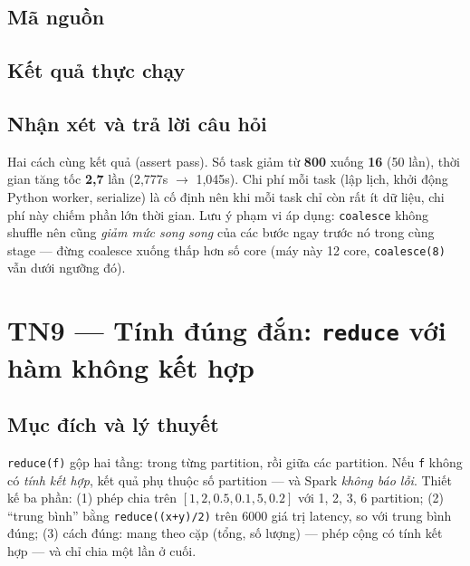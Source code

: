 \documentclass[12pt,a4paper,oneside]{article}
\begin{document}
\subsection{Mã nguồn}



\subsection{Kết quả thực chạy}



\subsection{Nhận xét và trả lời câu hỏi}

Hai cách cùng kết quả (assert pass). Số task giảm từ \textbf{800} xuống \textbf{16} (50 lần), thời gian tăng tốc \textbf{2,7} lần (2,777s $\to$ 1,045s). Chi phí mỗi task (lập lịch, khởi động Python worker, serialize) là cố định nên khi mỗi task chỉ còn rất ít dữ liệu, chi phí này chiếm phần lớn thời gian. Lưu ý phạm vi áp dụng: \texttt{coalesce} không shuffle nên cũng \emph{giảm mức song song} của các bước ngay trước nó trong cùng stage --- đừng coalesce xuống thấp hơn số core (máy này 12 core, \texttt{coalesce(8)} vẫn dưới ngưỡng đó).

\section{TN9 --- Tính đúng đắn: \texttt{reduce} với hàm không kết hợp}
\label{sec:tn9}

\subsection{Mục đích và lý thuyết}

\texttt{reduce(f)} gộp hai tầng: trong từng partition, rồi giữa các partition. Nếu \texttt{f} không có \emph{tính kết hợp}, kết quả phụ thuộc số partition --- và Spark \emph{không báo lỗi}. Thiết kế ba phần: (1) phép chia trên $[1, 2, 0.5, 0.1, 5, 0.2]$ với 1, 2, 3, 6 partition; (2) ``trung bình'' bằng \texttt{reduce((x+y)/2)} trên 6000 giá trị latency, so với trung bình đúng; (3) cách đúng: mang theo cặp (tổng, số lượng) --- phép cộng có tính kết hợp --- và chỉ chia một lần ở cuối.
\end{document}
